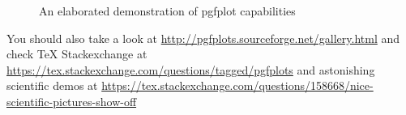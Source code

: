 \begin{figure}[!ht]
    \caption{An elaborated demonstration of pgfplot capabilities}
    \label{fig:An elaborated demonstration of pgfplot capabilities}
\end{figure}

You should also take a look at \url{http://pgfplots.sourceforge.net/gallery.html} and check TeX Stackexchange at \url{https://tex.stackexchange.com/questions/tagged/pgfplots} and astonishing scientific demos at \url{https://tex.stackexchange.com/questions/158668/nice-scientific-pictures-show-off}

